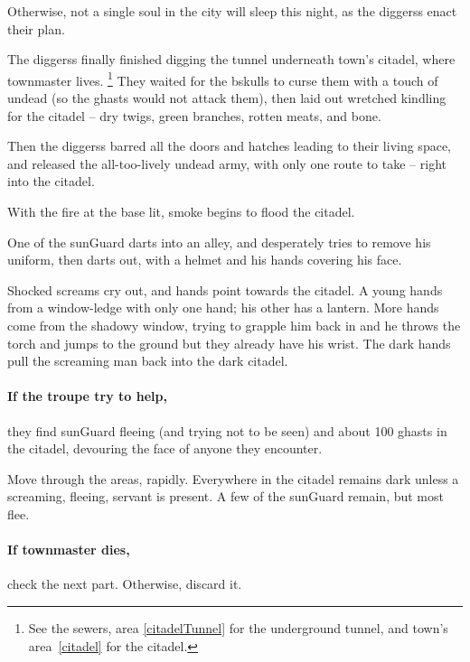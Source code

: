 Otherwise, not a single soul in the city will sleep this night, as the \glspl{diggers} enact their plan.

\begin{exampletext}
  The \glspl{diggers} finally finished digging the tunnel underneath \gls{town}'s citadel, where \gls{townmaster} lives.%
  \footnote{See the sewers, \gls{area} \vref{citadelTunnel} for the underground tunnel, and \gls{town}'s \gls{area}~\vref{citadel} for the citadel.}
  They waited for the \gls{bskulls} to curse them with a touch of undead (so the ghasts would not attack them), then laid out wretched kindling for the citadel -- dry twigs, green branches, rotten meats, and bone.

  Then the \glspl{diggers} barred all the doors and hatches leading to their living space, and released the all-too-lively undead army, with only one route to take -- right into the citadel.

  With the fire at the base lit, smoke begins to flood the citadel.
\end{exampletext}

\begin{boxtext}
  One of the \gls{sunGuard} darts into an alley, and desperately tries to remove his uniform, then darts out, with a helmet and his hands covering his face.

  Shocked screams cry out, and hands point towards the citadel.
  A young hands from a window-ledge with only one hand; his other has a lantern.
  More hands come from the shadowy window, trying to grapple him back in and he throws the torch and jumps to the ground but they already have his wrist.
  The dark hands pull the screaming man back into the dark citadel.
\end{boxtext}

\paragraph{If the troupe try to help,}
they find \gls{sunGuard} fleeing (and trying not to be seen) and about 100 ghasts in the citadel, devouring the face of anyone they encounter.

Move through the areas, rapidly.
Everywhere in the citadel remains dark unless a screaming, fleeing, servant is present.
A few of the \gls{sunGuard} remain, but most flee.


\paragraph{If \gls{townmaster} dies,}
check the next part.
Otherwise, discard it.

